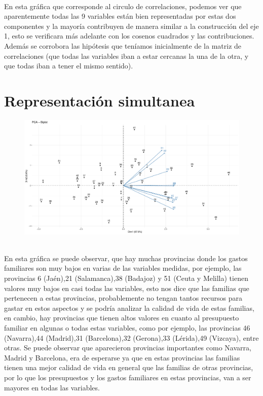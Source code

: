 \documentclass[report,oneside]{revcoles}
\begin{document}
~\\En esta gráfica que corresponde al circulo de correlaciones, podemos ver que aparentemente todas las 9 variables están bien representadas por estas dos componentes y la mayoría contribuyen de manera similar a la construcción del eje 1, esto se verificara más adelante con los cosenos cuadrados y las contribuciones. Además se corrobora las hipótesis que teníamos inicialmente de la matriz de correlaciones (que todas las variables iban a estar cercanas la una de la otra, y que todas iban a tener el mismo sentido).

\section{Representación simultanea}
\begin{figure}[h!]
  \centering
  \includegraphics[scale=0.45]{FigurasUV/biplot.pdf}
\end{figure}

~\\En esta gráfica se puede observar, que hay muchas provincias donde los gastos familiares son muy bajos en varias de las variables medidas, por ejemplo, las provincias 6 (Jaén),21 (Salamanca),38 (Badajoz) y 51 (Ceuta y Melilla) tienen valores muy bajos en casi todas las variables, esto nos dice que las familias que pertenecen a estas provincias, probablemente no tengan tantos recursos para gastar en estos aspectos y se podría analizar  la calidad de vida de estas familias, en cambio, hay provincias que tienen altos valores en cuanto al presupuesto familiar en algunas o todas estas variables, como por ejemplo, las provincias 46 (Navarra),44 (Madrid),31 (Barcelona),32 (Gerona),33 (Lérida),49 (Vizcaya), entre otras. Se puede observar que aparecieron provincias importantes como Navarra, Madrid y Barcelona, era de esperarse ya que en estas provincias las familias tienen una mejor calidad de vida en general que las familias de otras provincias, por lo que los presupuestos y los gastos familiares en estas provincias, van a ser mayores en todas las variables.
\end{document}
